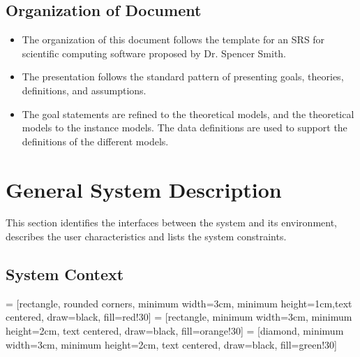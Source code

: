 \documentclass[12pt]{article}
\begin{document}
\subsection{Organization of Document}
\begin{itemize}
\item The organization of this document follows the template for an SRS for scientific 
computing software proposed by Dr. Spencer Smith. 
\item The presentation follows the standard pattern of presenting goals, theories, definitions, and assumptions. 
\item The goal statements are refined to the theoretical models, and the theoretical 
models to the instance models. The data definitions are used to support the definitions of the different models.
\end{itemize}
\newpage
\section{General System Description}
This section identifies the interfaces between the system and its environment,
describes the user characteristics and lists the system constraints.

\subsection{System Context}

 = [rectangle, rounded corners, minimum width=3cm, minimum height=1cm,text centered, draw=black, fill=red!30]
 = [rectangle, minimum width=3cm, minimum height=2cm, text centered, draw=black, fill=orange!30]
 = [diamond, minimum width=3cm, minimum height=2cm, text centered, draw=black, fill=green!30]

\end{document}
